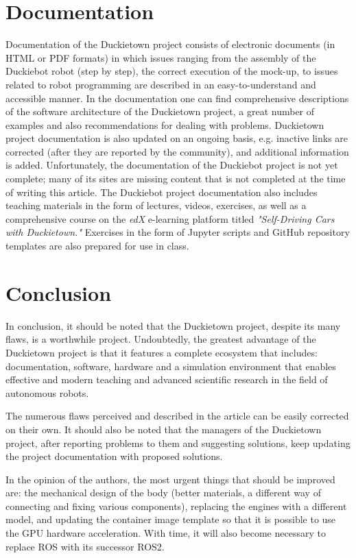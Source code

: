 \documentclass[conference]{IEEEtran}
\begin{document}
\section{Documentation}\label{sec:documentation}
Documentation of the Duckietown project consists of electronic documents (in HTML or PDF formats) in which issues ranging from the assembly of the Duckiebot robot (step by step), the correct execution of the mock-up, to issues related to robot programming are described in an easy-to-understand and accessible manner.
In the documentation one can find comprehensive descriptions of the software architecture of the Duckietown project, a great number of examples and also recommendations for dealing with problems. Duckietown project documentation is also updated on an ongoing basis, e.g. inactive links are corrected (after they are reported by the community), and additional information is added.
Unfortunately, the documentation of the Duckiebot project is not yet complete; many of its sites are missing content that is not completed at the time of writing this article.
The Duckiebot project documentation also includes teaching materials in the form of lectures, videos, exercises, as well as a comprehensive course on the \emph{edX} e-learning platform titled \emph{"Self-Driving Cars with Duckietown."} Exercises in the form of Jupyter scripts and GitHub repository templates are also prepared for use in class.

\section{Conclusion}\label{sec:conclusion}
In conclusion, it should be noted that the Duckietown project, despite its many flaws, is a worthwhile project. Undoubtedly, the greatest advantage of the Duckietown project is that it features a complete ecosystem that includes: documentation, software, hardware and a simulation environment that enables effective and modern teaching and advanced scientific research in the field of autonomous robots. 

The numerous flaws perceived and described in the article can be easily corrected on their own. It should also be noted that the managers of the Duckietown project, after reporting problems to them and suggesting solutions, keep updating the project documentation with proposed solutions. 

In the opinion of the authors, the most urgent things that should be improved are: the mechanical design of the body (better materials, a different way of connecting and fixing various components), replacing the engines with a different model, and updating the container image template so that it is possible to use the GPU hardware acceleration. With time, it will also become necessary to replace ROS with its successor ROS2.




\end{document}
